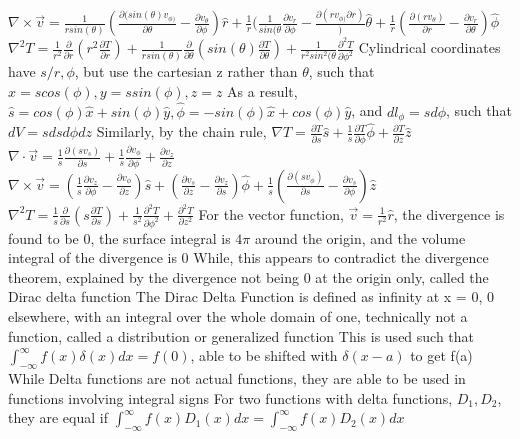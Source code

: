 \documentclass[11 pt, twoside]{article}
\newenvironment{outline*}
{
	\begin{outline}[enumerate]
	}
	{\end{outline}
}
\begin{document}
\begin{outline*}
		\3 $\nabla \times \vec{v} = \frac{1}{rsin(\theta)}(\frac{\partial(sin(\theta)v_{\phi)}}{\partial \theta} - \frac{\partial v_{\theta}}{\partial \phi})\hat{r} + \frac{1}{r}(\frac{1}{sin(\theta}\frac{\partial v_r}{\partial \phi} - \frac{\partial(rv_{\phi)}{\partial r})})\hat{\theta} + \frac{1}{r}(\frac{\partial(rv_{\theta})}{\partial r} - \frac{\partial v_r}{\partial \theta})\hat{\phi}$
		\3 $\nabla^2 T = \frac{1}{r^2}\frac{\partial}{\partial r}(r^2\frac{\partial T}{\partial r}) + \frac{1}{rsin(\theta)}\frac{\partial}{\partial \theta}(sin(\theta)\frac{\partial T}{\partial \theta}) + \frac{1}{r^2sin^2(\theta}\frac{\partial^2 T}{\partial \phi^2}$
\1 Cylindrical coordinates have $s/r, \phi$, but use the cartesian z rather than $\theta$, such that $x = scos(\phi), y = ssin(\phi), z = z$
	\2 As a result, $\hat{s} = cos(\phi)\hat{x} + sin(\phi)\hat{y}, \hat{\phi} = -sin(\phi)\hat{x} + cos(\phi)\hat{y}$, and $dl_{\phi} = sd\phi$, such that $dV = sdsd\phi dz$
	\2 Similarly, by the chain rule, $\nabla T = \frac{\partial T}{\partial s}\hat{s} + \frac{1}{s}\frac{\partial T}{\partial \phi}\hat{\phi} + \frac{\partial T}{\partial z}\hat{z}$
		\3 $\nabla \cdot \vec{v} = \frac{1}{s}\frac{\partial(sv_s)}{\partial s} + \frac{1}{s}\frac{\partial v_{\phi}}{\partial \phi} + \frac{\partial v_z}{\partial z}$
		\3 $\nabla \times \vec{v} = (\frac{1}{s}\frac{\partial v_{z}}{\partial \phi} - \frac{\partial v_{\phi}}{\partial z})\hat{s} + (\frac{\partial v_s}{\partial z} - \frac{\partial v_z}{\partial s})\hat{\phi} + \frac{1}{s}(\frac{\partial(sv_{\phi})}{\partial s} - \frac{\partial v_s}{\partial \phi})\hat{z}$
		\3 $\nabla^2 T = \frac{1}{s}\frac{\partial}{\partial s}(s\frac{\partial T}{\partial s}) + \frac{1}{s^2}\frac{\partial^2 T}{\partial \phi^2} + \frac{\partial^2 T}{\partial z^2}$
\1 For the vector function, $\vec{v} = \frac{1}{r^2}\hat{r}$, the divergence is found to be 0, the surface integral is $4\pi$ around the origin, and the volume integral of the divergence is 0	
	\2 While, this appears to contradict the divergence theorem, explained by the divergence not being 0 at the origin only, called the Dirac delta function
	\2 The Dirac Delta Function is defined as infinity at x = 0, 0 elsewhere, with an integral over the whole domain of one, technically not a function, called a distribution or generalized function
		\3 This is used such that $\int^{\infty}_{-\infty} f(x)\delta(x)dx = f(0)$, able to be shifted with $\delta(x - a)$ to get f(a)
		\3 While Delta functions are not actual functions, they are able to be used in functions involving integral signs
			\4 For two functions with delta functions, $D_1, D_2$, they are equal if $\int^{\infty}_{-\infty} f(x)D_1(x)dx = \int^{\infty}_{-\infty} f(x)D_2(x)dx$

\end{outline*}
\end{document}
